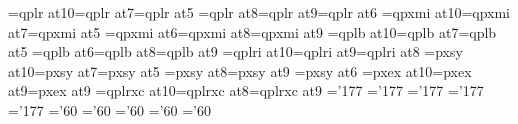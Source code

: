 \ifx\PT\undefined{}\fi
\font\tenrm=qplr at10\PT \font\sevenrm=qplr at7\PT \font\fiverm=qplr at5\PT
\font\eightrm=qplr at8\PT \font\ninerm=qplr at9\PT \font\sixrm=qplr at6\PT
\font\teni=qpxmi at10\PT \font\seveni=qpxmi at7\PT \font\fivei=qpxmi at5\PT
\font\sixi=qpxmi at6\PT  \font\eighti=qpxmi at8\PT \font\ninei=qpxmi at9\PT
\font\tenbf=qplb at10\PT \font\sevenbf=qplb at7\PT \font\fivebf=qplb at5\PT
\font\sixbf=qplb at6\PT  \font\eightbf=qplb at8\PT \font\ninebf=qplb at9\PT
\font\tenit=qplri at10\PT \font\nineit=qplri at9\PT \font\eightit=qplri at8\PT
\font\tensy=pxsy at10\PT \font\sevensy=pxsy at7\PT \font\fivesy=pxsy at5\PT
\font\eightsy=pxsy at8\PT \font\ninesy=pxsy at9\PT
\font\sixsy=pxsy at6\PT
\font\tenex=pxex at10\PT \font\eightex=pxex at9\PT \font\nineex=pxex at9\PT
\font\tencsc=qplrxc at10\PT \font\eightcsc=qplrxc at8\PT \font\ninecsc=qplrxc at9\PT
%
\skewchar\teni='177 \skewchar\ninei='177 \skewchar\eighti='177
\skewchar\seveni='177 \skewchar\fivei='177
\skewchar\tensy='60 \skewchar\ninesy='60 \skewchar\eightsy='60
\skewchar\sevensy='60 \skewchar\fivesy='60
%
\def\eightpoint{\def\rm{\fam0\eightrm}%
\textfont0\eightrm \scriptfont0=\sixrm \scriptscriptfont0=\fiverm
\textfont1\eighti  \scriptfont1=\sixi  \scriptscriptfont1=\fivei
\textfont2\eightsy \scriptfont2=\sixsy   \scriptscriptfont2=\fivesy
\textfont3\eightex \scriptfont3=\eightex \scriptscriptfont3=\eightex
\def\mit{\fam1}\def\oldstyle{\fam1\eighti}\def\cal{\fam2}%
\textfont\itfam=\eightit \def\it{\fam\itfam\eightit}%
\textfont\bffam=\eightbf \scriptfont\bffam=\sixbf\scriptscriptfont\bffam=\fivebf
\def\bf{\fam\bffam\eightbf}%
\let\sc=\eightcsc
\normalbaselineskip=10\PT
\setbox\strutbox=\hbox{\vrule height7.6\PT depth 2.4\PT width0pt}%
\normalbaselines\rm}
\def\ninepoint{\def\rm{\fam0\ninerm}%
\textfont0=\ninerm \scriptfont0=\sixrm \scriptscriptfont0=\fiverm
\textfont1=\ninei  \scriptfont1=\sixi  \scriptscriptfont1=\fivei
\textfont2=\ninesy \scriptfont2=\sixsy  \scriptscriptfont2=\fivesy
\textfont3=\nineex \scriptfont3=\nineex \scriptscriptfont3=\nineex
\def\mit{\fam1}\def\oldstyle{\fam1\ninei}\def\cal{\fam2}%
\textfont\itfam=\nineit \def\it{\fam\itfam\nineit}%
\textfont\bffam=\ninebf \scriptfont\bffam=\sixbf \scriptscriptfont\bffam=\fivebf
\def\bf{\fam\bffam\ninebf}%
\let\sc=\ninecsc
\normalbaselineskip=11\PT
\setbox\strutbox=\hbox{\vrule height8\PT depth3\PT width0pt}%
\normalbaselines\rm}

